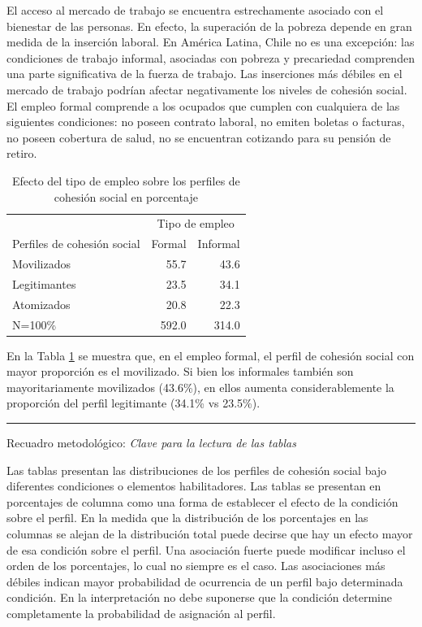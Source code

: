 \documentclass[
  12pt,
]{book}
\begin{document}
El acceso al mercado de trabajo se encuentra estrechamente asociado con el bienestar de las personas. En efecto, la superación de la pobreza depende en gran medida de la inserción laboral. En América Latina, Chile no es una excepción: las condiciones de trabajo informal, asociadas con pobreza y precariedad comprenden una parte significativa de la fuerza de trabajo. Las inserciones más débiles en el mercado de trabajo podrían afectar negativamente los niveles de cohesión social. El empleo formal comprende a los ocupados que cumplen con cualquiera de las siguientes condiciones: no poseen contrato laboral, no emiten boletas o facturas, no poseen cobertura de salud, no se encuentran cotizando para su pensión de retiro.

\begin{table}

\caption{\label{tab:tabla-empleo}Efecto del tipo de empleo sobre los perfiles de cohesión social en porcentaje}
\centering
\begin{tabular}[t]{l|r|r}
\hline
\multicolumn{1}{c|}{ } & \multicolumn{2}{c}{Tipo de empleo} \\
\cline{2-3}
Perfiles de cohesión social & Formal & Informal\\
\hline
Movilizados & 55.7 & 43.6\\
\hline
Legitimantes & 23.5 & 34.1\\
\hline
Atomizados & 20.8 & 22.3\\
\hline
N=100\% & 592.0 & 314.0\\
\hline
\end{tabular}
\end{table}

En la Tabla \ref{tab:tabla-empleo} se muestra que, en el empleo formal, el perfil de cohesión social con mayor proporción es el movilizado. Si bien los informales también son mayoritariamente movilizados (43.6\%), en ellos aumenta considerablemente la proporción del perfil legitimante (34.1\% vs 23.5\%).

\begin{center}\rule{0.5\linewidth}{0.5pt}\end{center}

Recuadro metodológico: \emph{Clave para la lectura de las tablas}

Las tablas presentan las distribuciones de los perfiles de cohesión social bajo diferentes condiciones o elementos habilitadores. Las tablas se presentan en porcentajes de columna como una forma de establecer el efecto de la condición sobre el perfil. En la medida que la distribución de los porcentajes en las columnas se alejan de la distribución total puede decirse que hay un efecto mayor de esa condición sobre el perfil. Una asociación fuerte puede modificar incluso el orden de los porcentajes, lo cual no siempre es el caso. Las asociaciones más débiles indican mayor probabilidad de ocurrencia de un perfil bajo determinada condición. En la interpretación no debe suponerse que la condición determine completamente la probabilidad de asignación al perfil.
\end{document}
